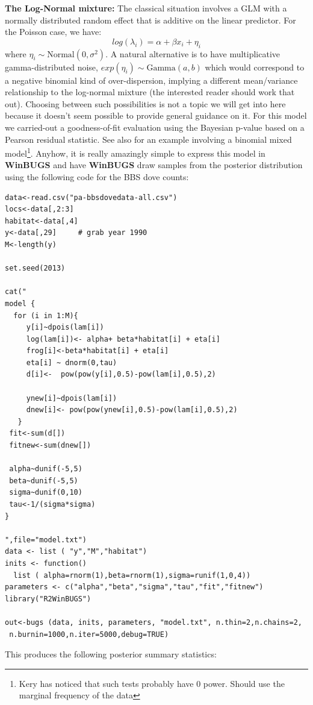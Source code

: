 {\bf The Log-Normal mixture:} The classical situation involves a GLM
with a normally distributed random effect that is additive on the
linear predictor. For the Poisson case, we have:
\[
 	log(\lambda_{i}) = \alpha  + \beta x_{i} + \eta_{i}
\]
where $\eta_{i} \sim \mbox{Normal}(0,\sigma^{2})$.  A natural
alternative is to have multiplicative gamma-distributed noise,
$exp(\eta_{i}) \sim \mbox{Gamma}(a,b)$ which would correspond to a
negative binomial kind of over-dispersion, implying a different
mean/variance relationship to the log-normal mixture (the interested
reader should work that out).  Choosing between such possibilities is
not a topic we will get into here because it doesn't seem possible to
provide general guidance on it.  For this model we carried-out a
goodness-of-fit evaluation using the Bayesian p-value based on a
Pearson residual statistic. See also \citep[][ch. 18]{kery:2010} for
an example involving a binomial mixed model\footnote{Kery has noticed
  that such tests probably have 0 power. Should use the marginal
  frequency of the data}.  Anyhow, it is really amazingly simple to
express this model in {\bf WinBUGS} and have {\bf WinBUGS} draw
samples from the posterior distribution using the following code for
the BBS dove counts: 
{\small
\begin{verbatim}
data<-read.csv("pa-bbsdovedata-all.csv")
locs<-data[,2:3]
habitat<-data[,4]
y<-data[,29]     # grab year 1990
M<-length(y)

set.seed(2013)

cat("
model {
  for (i in 1:M){
     y[i]~dpois(lam[i])
     log(lam[i])<- alpha+ beta*habitat[i] + eta[i]
     frog[i]<-beta*habitat[i] + eta[i]
     eta[i] ~ dnorm(0,tau)
     d[i]<-  pow(pow(y[i],0.5)-pow(lam[i],0.5),2)

     ynew[i]~dpois(lam[i])
     dnew[i]<- pow(pow(ynew[i],0.5)-pow(lam[i],0.5),2)
   }
 fit<-sum(d[])
 fitnew<-sum(dnew[])

 alpha~dunif(-5,5)
 beta~dunif(-5,5)
 sigma~dunif(0,10)
 tau<-1/(sigma*sigma)
}

",file="model.txt")
data <- list ( "y","M","habitat")
inits <- function()
  list ( alpha=rnorm(1),beta=rnorm(1),sigma=runif(1,0,4))
parameters <- c("alpha","beta","sigma","tau","fit","fitnew")
library("R2WinBUGS")

out<-bugs (data, inits, parameters, "model.txt", n.thin=2,n.chains=2,
 n.burnin=1000,n.iter=5000,debug=TRUE)
\end{verbatim}
}
This produces the following posterior summary statistics:

